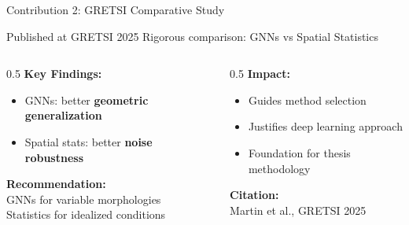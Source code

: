 \documentclass[aspectratio=169]{beamer}
\begin{document}
\begin{frame}{Contribution 2: GRETSI Comparative Study}
    \begin{block}{Published at GRETSI 2025}
        Rigorous comparison: GNNs vs Spatial Statistics
    \end{block}
    
    \vspace{0.5em}
    \begin{columns}
        \begin{column}{0.5\textwidth}
            \textbf{Key Findings:}
            \begin{itemize}
                \item GNNs: better \textbf{geometric generalization}
                \item Spatial stats: better \textbf{noise robustness}
            \end{itemize}
            
            \vspace{0.5em}
            \textbf{Recommendation:}\\
            GNNs for variable morphologies\\
            Statistics for idealized conditions
        \end{column}
        \begin{column}{0.5\textwidth}
            \textbf{Impact:}
            \begin{itemize}
                \item Guides method selection
                \item Justifies deep learning approach
                \item Foundation for thesis methodology
            \end{itemize}
            
            \vspace{0.5em}
            \textbf{Citation:}\\
            {\footnotesize Martin et al., GRETSI 2025}
        \end{column}
    \end{columns}
\end{frame}
\end{document}
